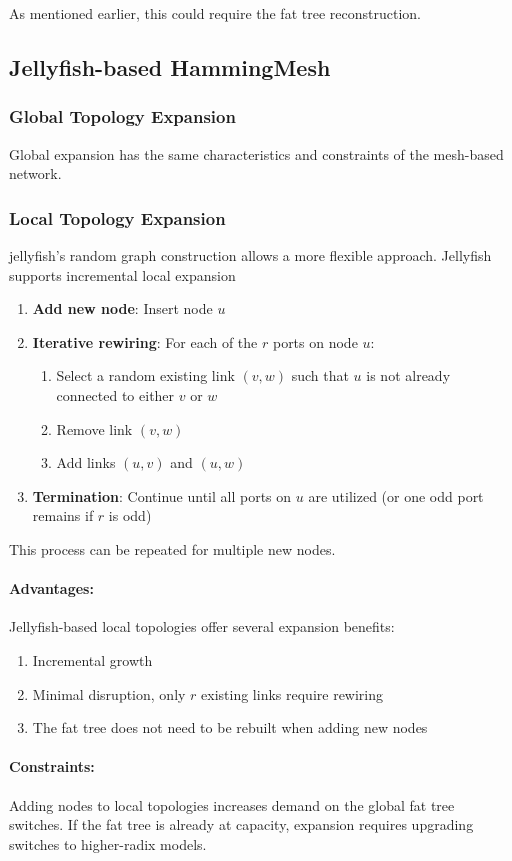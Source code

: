 \documentclass{article}
\begin{document}
As mentioned earlier, this could require the fat tree reconstruction.

\subsection{Jellyfish-based HammingMesh}
\subsubsection{Global Topology Expansion}
Global expansion has the same characteristics and constraints of the mesh-based network.

\subsubsection{Local Topology Expansion}
jellyfish's random graph construction allows a more flexible approach.
Jellyfish supports incremental local expansion \cite{Singla2012}


\begin{enumerate}
    \item \textbf{Add new node}: Insert node $u$

    \item \textbf{Iterative rewiring}: For each of the $r$ ports on node $u$:
    \begin{enumerate}
        \item Select a random existing link $(v, w)$ such that $u$ is not already connected to either $v$ or $w$
        \item Remove link $(v, w)$
        \item Add links $(u, v)$ and $(u, w)$
    \end{enumerate}

    \item \textbf{Termination}: Continue until all ports on $u$ are utilized (or one odd port remains if $r$ is odd)
\end{enumerate}

This process can be repeated for multiple new nodes.

\paragraph{Advantages:}
Jellyfish-based local topologies offer several expansion benefits:
\begin{enumerate}
    \item Incremental growth
    \item Minimal disruption, only $r$ existing links require rewiring
    \item The fat tree does not need to be rebuilt when adding new nodes
\end{enumerate}

\paragraph{Constraints:}
Adding nodes to local topologies increases demand on the global fat tree switches. If the fat tree is already at capacity, expansion requires upgrading switches to higher-radix models.





\end{document}

